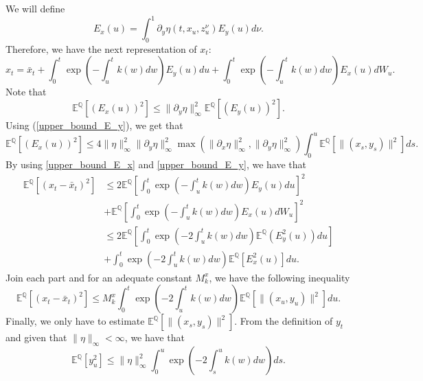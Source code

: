 \documentclass[a4paper,10pt]{article}
\newcommand{\1}{\mathbf{1}}
\begin{document}
We will define 
\begin{equation*}
E_{x}\left(u\right) = \int_{0}^{1}\partial_y\eta(t,x_u,z^{\nu}_{u}) E_{y}(u) d\nu. 
\end{equation*}
Therefore, we have the next representation of $x_t$:
\begin{equation*}
x_t = \bar{x}_t + \int_{0}^{t} \exp\left(- \int_{u}^{t} k(w) dw\right) E_{y}(u) du + \int_{0}^{t} \exp\left(- \int_{u}^{t} k(w) dw\right) E_{x}(u) dW_u.
\end{equation*}
Note that
\begin{equation*}
 \mathbb{E}^{\mathbb{Q}}[(E_x(u))^{2}] \leq \|\partial_y \eta \|^{2}_{\infty} \mathbb{E}^{\mathbb{Q}}[(E_{y}(u))^{2}]. 
\end{equation*}
Using (\ref{upper_bound_E_y}), we get that
\begin{equation}\label{upper_bound_E_x}
 \mathbb{E}^{\mathbb{Q}}[(E_x(u))^{2}] \leq 4 \|\eta\|^{2}_{\infty} \|\partial_y \eta\|^{2}_{\infty} \max(\|\partial_x\eta\|^{2}_{\infty},\|\partial_y \eta\|^{2}_{\infty} ) \int_{0}^{u} \mathbb{E}^{\mathbb{Q}}\left[ \|(x_s, y_s)\|^{2}\right] ds.
\end{equation}
By using \eqref{upper_bound_E_x} and \eqref{upper_bound_E_y}, we have that 
\begin{align*}
\mathbb{E}^{\mathbb{Q}}[(x_t - \bar{x}_t)^{2}] & \leq 2 \mathbb{E}^{\mathbb{Q}}\left[ \int_{0}^{t} \exp\left(- \int_{u}^{t} k(w) dw\right) E_{y}(u) du    \right]^2\\
&+ \mathbb{E}^{\mathbb{Q}}\left[ \int_{0}^{t} \exp\left(- \int_{u}^{t} k(w) dw\right) E_{x}(u) dW_u\right]^{2} \\
&\leq 2 \mathbb{E}^{\mathbb{Q}}\left[\int_{0}^{t} \exp\left(- 2\int_{u}^{t} k(w) dw\right) \mathbb{E}^{\mathbb{Q}}(E^{2}_{y}(u)) du\right]\\
&+ \int_{0}^{t} \exp\left(- 2\int_{u}^{t} k(w) dw\right) \mathbb{E}^{\mathbb{Q}}[E^{2}_{x}(u)] du. 
\end{align*}
Join each part and for an adequate constant $M^{x}_k$, we have the following inequality 
\begin{equation*}
\mathbb{E}^{\mathbb{Q}}[(x_t - \bar{x}_t)^{2}]\leq M^{x}_k \int_{0}^{t} \exp\left(- 2\int_{u}^{t} k(w) dw\right) \mathbb{E}^{\mathbb{Q}}\left[ \|(x_u, y_u)\|^{2}\right] du.
\end{equation*}
Finally, we only have to estimate $\mathbb{E}^{\mathbb{Q}}\left[ \|(x_s, y_s)\|^{2}\right]$. From the definition of $y_t$ and given that $\|\eta\|_{\infty} < \infty$, we have that
\begin{equation*}
\mathbb{E}^{\mathbb{Q}}[y^{2}_u] \leq \|\eta\|^{2}_{\infty} \int_{0}^{u} \exp\left(- 2\int_{s}^{u} k(w) dw\right) ds.
\end{equation*}
\end{document}
